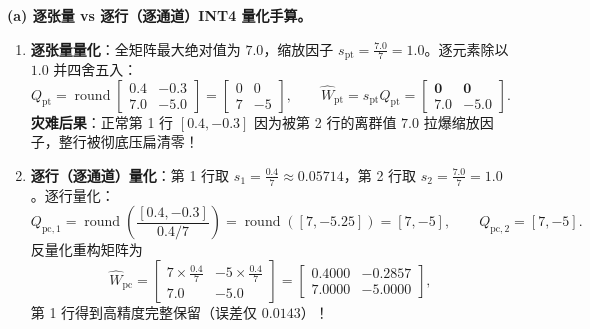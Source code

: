 \textbf{(a) 逐张量 vs 逐行（逐通道）INT4 量化手算。}
\begin{enumerate}
  \item \textbf{逐张量量化}：全矩阵最大绝对值为 $7.0$，缩放因子 $s_{\mathrm{pt}} = \frac{7.0}{7} = \mathbf{1.0}$。逐元素除以 $1.0$ 并四舍五入：
  \[
    Q_{\mathrm{pt}} = \operatorname{round}\!\begin{bmatrix} 0.4 & -0.3 \\ 7.0 & -5.0 \end{bmatrix}
    = \begin{bmatrix} 0 & 0 \\ 7 & -5 \end{bmatrix}, \qquad
    \hat{W}_{\mathrm{pt}} = s_{\mathrm{pt}} Q_{\mathrm{pt}} = \mathbf{\begin{bmatrix} 0 & 0 \\ 7.0 & -5.0 \end{bmatrix}}.
  \]
  \textbf{灾难后果}：正常第 1 行 $[0.4, -0.3]$ 因为被第 2 行的离群值 $7.0$ 拉爆缩放因子，整行被彻底压扁清零！
  \item \textbf{逐行（逐通道）量化}：第 1 行取 $s_1 = \frac{0.4}{7} \approx 0.05714$，第 2 行取 $s_2 = \frac{7.0}{7} = 1.0$。逐行量化：
  \[
    Q_{\mathrm{pc},1} = \operatorname{round}\!\left(\frac{[0.4, -0.3]}{0.4/7}\right) = \operatorname{round}([7, -5.25]) = [7, -5], \qquad
    Q_{\mathrm{pc},2} = [7, -5].
  \]
  反量化重构矩阵为
  \[
    \hat{W}_{\mathrm{pc}} = \begin{bmatrix} 7 \times \frac{0.4}{7} & -5 \times \frac{0.4}{7} \\ 7.0 & -5.0 \end{bmatrix}
    = \mathbf{\begin{bmatrix} 0.4000 & -0.2857 \\ 7.0000 & -5.0000 \end{bmatrix}},
  \]
  第 1 行得到高精度完整保留（误差仅 $0.0143$）！
\end{enumerate}

